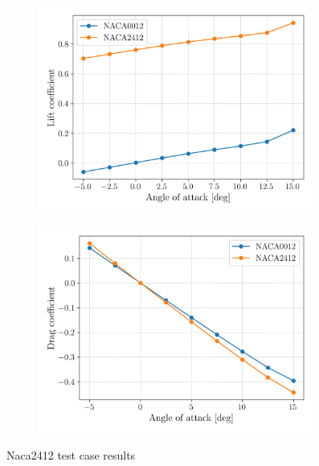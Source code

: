 \documentclass{article}
\begin{document}
\begin{figure}[H]
    \centering
    \begin{subfigure}{0.49\textwidth}
        \centering
        \includegraphics[width=0.99\textwidth]{figures/cl_alpha.png}
        \caption{}
        \label{fig:cl_alpha}
    \end{subfigure}
    \begin{subfigure}{0.49\textwidth}
        \centering
        \includegraphics[width=0.99\textwidth]{figures/cd_alpha.png}
        \caption{}
        \label{fig:cd_alpha}
    \end{subfigure}
    \caption{Naca2412 test case results}
\end{figure}
\end{document}
